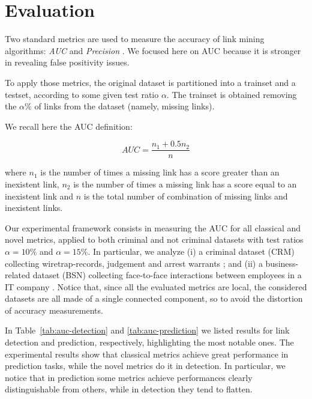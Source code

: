 \section{Evaluation}
\label{sec:evaluation}

Two standard metrics are used to measure the accuracy of link mining algorithms: \textit{AUC} and  \textit{Precision} \cite{Lu2011}. We focused here on AUC because it is stronger in revealing false positivity issues.

To apply those metrics, the original dataset is partitioned into a trainset and a testset, according to some given test ratio $\alpha$. The trainset is obtained removing the $\alpha\%$ of links from the dataset (namely, missing links).

We recall here the AUC definition:

\begin{equation}
\label{eqn:auc}
AUC=\frac{n_{1}+0.5n_{2}}{n}
\end{equation}

where 
$n_{1}$ is the number of times a missing link has a score greater than an inexistent link,
$n_{2}$ is the number of times a missing link has a score equal to an inexistent link and
$n$ is the total number of combination of missing links and inexistent links.

Our experimental framework consists in measuring the AUC for all classical and novel metrics, applied to both criminal and not criminal datasets with test ratios $\alpha=10\%$ and $\alpha=15\%$.
In particular, we analyze 
(i) a criminal dataset (CRM) collecting wiretrap-records, judgement and arrest warrants \cite{berlusconi2016link}; and
(ii) a business-related dataset (BSN) collecting face-to-face interactions between employees in a IT company \cite{olguin2009sensible}.
Notice that, since all the evaluated metrics are local, the considered datasets are all made of a single connected component, so to avoid the distortion of accuracy measurements.

In Table~\ref{tab:auc-detection} and \ref{tab:auc-prediction} we listed results for link detection and prediction, respectively, highlighting the most notable ones.
The experimental results show that classical metrics achieve great performance in prediction tasks, while the novel metrics do it in detection.
In particular, we notice that in prediction some metrics achieve performances clearly distinguishable from others, while in detection they tend to flatten.


